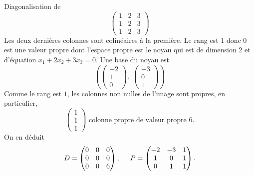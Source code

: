 Diagonalisation de
\[
\begin{pmatrix}
 1 & 2 & 3 \\  1 & 2 & 3 \\  1 & 2 & 3 
\end{pmatrix}  
\]
Les deux dernières colonnes sont colinéaires à la première. Le rang est 1 donc $0$ est une valeur propre dont l'espace propre est le noyau qui est de dimension $2$ et d'équation $x_1 + 2x_2 + 3x_3 = 0$. Une base du noyau est 
\[
  (\begin{pmatrix}
    -2 \\ 1 \\ 0
  \end{pmatrix}, \;
  \begin{pmatrix}
    -3 \\ 0 \\ 1
  \end{pmatrix} )
\]
Comme le rang est $1$, les colonnes non nulles de l'image sont propres, en particulier,
\[
  \begin{pmatrix}
    1 \\ 1 \\ 1
  \end{pmatrix}
\text{ colonne propre de valeur propre } 6.
\]
On en déduit
\[
  D =
  \begin{pmatrix}
    0 & 0 & 0\\ 0 & 0 & 0\\ 0 & 0 & 6 
  \end{pmatrix},\hspace{0.5cm}
  P=
  \begin{pmatrix}
    -2 & -3 & 1 \\ 1 & 0 & 1 \\ 0 & 1 & 1
  \end{pmatrix}.
\]


